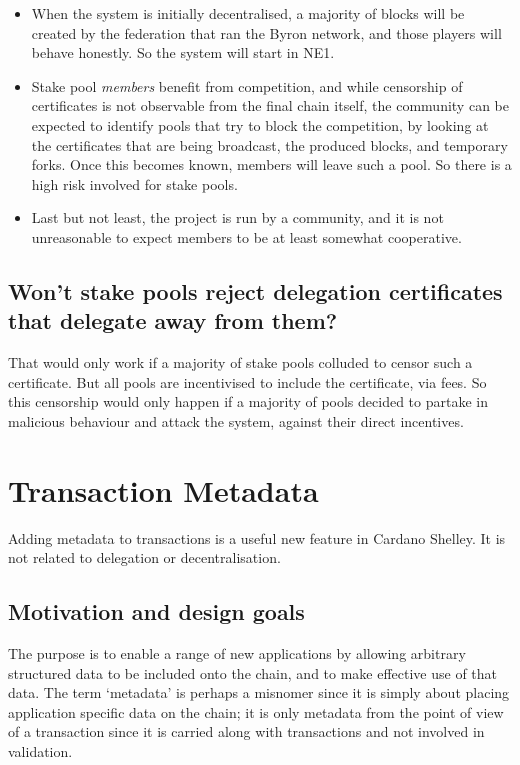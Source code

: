 \documentclass[11pt,a4paper,dvipsnames,twosided]{article}
\begin{document}
\begin{itemize}
\item When the system is initially decentralised, a majority of blocks will be
  created by the federation that ran the Byron network, and those players will
  behave honestly. So the system will start in NE1.
\item Stake pool \emph{members} benefit from competition, and while censorship
  of certificates is not observable from the final chain itself, the community
  can be expected to identify pools that try to block the competition, by
  looking at the certificates that are being broadcast, the produced blocks, and
  temporary forks. Once this becomes known, members will leave such a pool. So
  there is a high risk involved for stake pools.
\item Last but not least, the project is run by a community, and it is not
  unreasonable to expect members to be at least somewhat cooperative.
\end{itemize}

\subsection{Won't stake pools reject delegation certificates that delegate away
  from them?}

That would only work if a majority of stake pools colluded to censor such a
certificate. But all pools are incentivised to include the certificate, via
fees. So this censorship would only happen if a majority of pools decided to
partake in malicious behaviour and attack the system, against their direct
incentives.

\section{Transaction Metadata}

Adding metadata to transactions is a useful new feature in Cardano Shelley.
It is not related to delegation or decentralisation.

\subsection{Motivation and design goals}

The purpose is to enable a range of new applications by allowing arbitrary
structured data to be included onto the chain, and to make effective use of
that data. The term `metadata' is perhaps a misnomer since it is simply about
placing application specific data on the chain; it is only metadata from the
point of view of a transaction since it is carried along with transactions and
not involved in validation.
\end{document}
